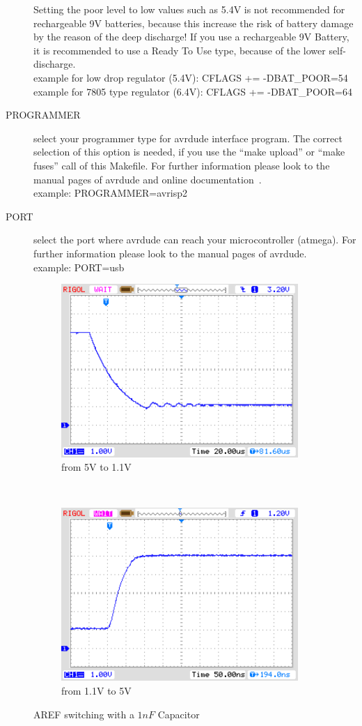 \begin{description}
Setting the poor level to low values such as 5.4V is not recommended for rechargeable 9V batteries,
because this increase the risk of battery damage by the reason of the deep discharge!
If you use a rechargeable 9V Battery, it is recommended to use a Ready To Use type, because of the lower self-discharge.\\
example for low drop regulator (5.4V): CFLAGS += -DBAT\_POOR=54\\
example for 7805 type regulator (6.4V): CFLAGS += -DBAT\_POOR=64
  \item[PROGRAMMER] select your programmer type for avrdude interface program.
The correct selection of this option is needed, if you use the ``make upload'' or ``make fuses'' call
of this Makefile.
For further information please look to the manual pages of avrdude and online documentation~\cite{avrdude}.\\
example: PROGRAMMER=avrisp2
  \item[PORT] select the port where avrdude can reach your microcontroller (atmega).
For further information please look to the manual pages of avrdude.\\
example: PORT=usb

\end{description}

\begin{figure}[H]
  \begin{subfigure}[b]{9cm}
    \centering
    \includegraphics[width=9cm]{../PNG/AREF2_1V.png}
    \caption{from 5V to 1.1V }
    \label{pic:aref1}
  \end{subfigure}
  ~
  \begin{subfigure}[b]{9cm}
    \centering
    \includegraphics[width=9cm]{../PNG/AREF2VCC.png}
    \caption{from 1.1V to 5V}
    \label{pic:aref5}
  \end{subfigure}
  \caption{AREF switching with a \(1nF\) Capacitor}
\end{figure}


